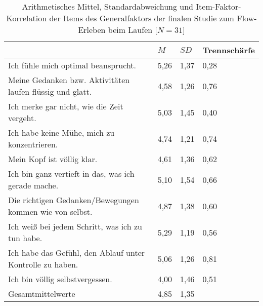 \newpage
\begin{table}
	[!htb] \centering \caption[Item-Faktor-Korrelation der Items des Generalfaktors (Finale Studie: Laufen)]{Arithmetisches Mittel, Standardabweichung und Item-Faktor-Korrelation der Items des Generalfaktors der finalen Studie zum Flow-Erleben beim Laufen [$N = 31$]} \label{tab:generalfaktor_3} 
	\begin{tabularx}
		{ 
		\textwidth}{p{} p{} p{} p{}} \toprule & $M$ & $SD$ & Trennschärfe \\
		\midrule Ich fühle mich optimal beansprucht. & 5,26 & 1,37 & 0,28 \\
		Meine Gedanken bzw. Aktivitäten laufen flüssig und glatt. & 4,58 & 1,26 & 0,76 \\
		Ich merke gar nicht, wie die Zeit vergeht. & 5,03 & 1,45 & 0,40 \\
		Ich habe keine Mühe, mich zu konzentrieren. & 4,74 & 1,21 & 0,74 \\
		Mein Kopf ist völlig klar. & 4,61 & 1,36 & 0,62 \\
		Ich bin ganz vertieft in das, was ich gerade mache. & 5,10 & 1,54 & 0,66 \\
		Die richtigen Gedanken/Bewegungen kommen wie von selbst. & 4,87 & 1,38 & 0,60 \\
		Ich weiß bei jedem Schritt, was ich zu tun habe. & 5,29 & 1,19 & 0,56 \\
		Ich habe das Gefühl, den Ablauf unter Kontrolle zu haben. & 5,06 & 1,26 & 0,81 \\
		Ich bin völlig selbstvergessen. & 4,00 & 1,46 & 0,51 \\
		Gesamtmittelwerte & 4,85 & 1,35 & \\
		\bottomrule 
	\end{tabularx}
\end{table}
